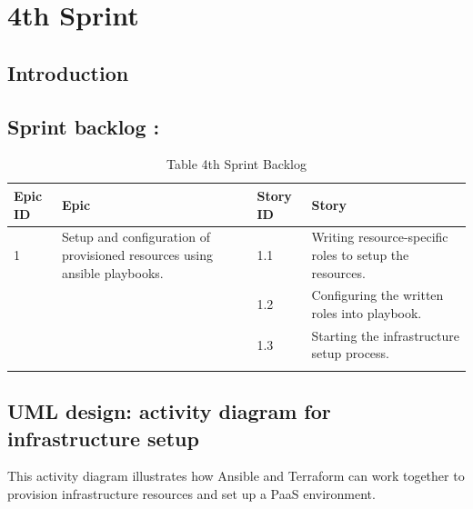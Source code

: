 \graphicspath{{./assets/}}
\setcounter{mtc}{5}
\chapter{4th Sprint }

\minitoc
\newpage
\section*{Introduction}

\section{Sprint backlog :}

\begin{longtable}[H]{|m{1.5cm}|m{3cm}|m{1.5cm}|m{9cm}|}
\hline
{\textbf{Epic ID}} & {\textbf{Epic}} & {\textbf{Story ID}} & {\textbf{Story}}\\
\hline
1  & Setup and configuration of provisioned resources using ansible playbooks.	 &  1.1	 &  Writing resource-specific roles to setup the resources. \\
\cline{3-4}
& & 1.2 & Configuring the written roles into playbook. \\
\cline{3-4}
& & 1.3	& Starting the infrastructure setup process. \\
\cline{3-4}
\hline
\caption{Table 4th Sprint Backlog}
\end{longtable}

\section{UML design: activity diagram for infrastructure setup}


This activity diagram illustrates how Ansible and Terraform can work together to provision infrastructure resources and set up a PaaS environment.


